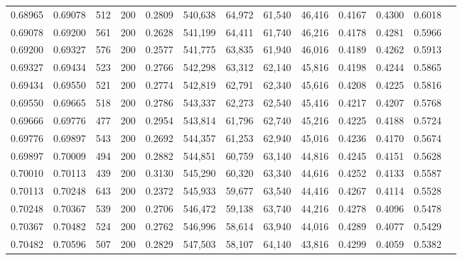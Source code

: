 \begin{tabular}{rrrrrrrrrrrrr}
0.68965 & 0.69078 &    512 & 200 &                                     0.2809 & 540,638 &  64,972 &  61,540 &  46,416 & 0.4167 & 0.4300 & 0.6018 \\
0.69078 & 0.69200 &    561 & 200 &                                     0.2628 & 541,199 &  64,411 &  61,740 &  46,216 & 0.4178 & 0.4281 & 0.5966 \\
0.69200 & 0.69327 &    576 & 200 &                                     0.2577 & 541,775 &  63,835 &  61,940 &  46,016 & 0.4189 & 0.4262 & 0.5913 \\
0.69327 & 0.69434 &    523 & 200 &                                     0.2766 & 542,298 &  63,312 &  62,140 &  45,816 & 0.4198 & 0.4244 & 0.5865 \\
0.69434 & 0.69550 &    521 & 200 &                                     0.2774 & 542,819 &  62,791 &  62,340 &  45,616 & 0.4208 & 0.4225 & 0.5816 \\
0.69550 & 0.69665 &    518 & 200 &                                     0.2786 & 543,337 &  62,273 &  62,540 &  45,416 & 0.4217 & 0.4207 & 0.5768 \\
0.69666 & 0.69776 &    477 & 200 &                                     0.2954 & 543,814 &  61,796 &  62,740 &  45,216 & 0.4225 & 0.4188 & 0.5724 \\
0.69776 & 0.69897 &    543 & 200 &                                     0.2692 & 544,357 &  61,253 &  62,940 &  45,016 & 0.4236 & 0.4170 & 0.5674 \\
0.69897 & 0.70009 &    494 & 200 &                                     0.2882 & 544,851 &  60,759 &  63,140 &  44,816 & 0.4245 & 0.4151 & 0.5628 \\
0.70010 & 0.70113 &    439 & 200 &                                     0.3130 & 545,290 &  60,320 &  63,340 &  44,616 & 0.4252 & 0.4133 & 0.5587 \\
0.70113 & 0.70248 &    643 & 200 &                                     0.2372 & 545,933 &  59,677 &  63,540 &  44,416 & 0.4267 & 0.4114 & 0.5528 \\
0.70248 & 0.70367 &    539 & 200 &                                     0.2706 & 546,472 &  59,138 &  63,740 &  44,216 & 0.4278 & 0.4096 & 0.5478 \\
0.70367 & 0.70482 &    524 & 200 &                                     0.2762 & 546,996 &  58,614 &  63,940 &  44,016 & 0.4289 & 0.4077 & 0.5429 \\
0.70482 & 0.70596 &    507 & 200 &                                     0.2829 & 547,503 &  58,107 &  64,140 &  43,816 & 0.4299 & 0.4059 & 0.5382 \\

\end{tabular}
